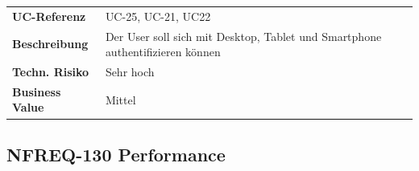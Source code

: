 \begin{longtable}[c]{@{}ll@{}}
\toprule
\begin{minipage}[t]{0.20\columnwidth}\raggedright\strut
\textbf{UC-Referenz}
\strut\end{minipage} &
\begin{minipage}[t]{0.74\columnwidth}\raggedright\strut
UC-25, UC-21, UC22
\strut\end{minipage}\tabularnewline
\begin{minipage}[t]{0.20\columnwidth}\raggedright\strut
\textbf{Beschreibung}
\strut\end{minipage} &
\begin{minipage}[t]{0.74\columnwidth}\raggedright\strut
Der User soll sich mit Desktop, Tablet und Smartphone authentifizieren
können
\strut\end{minipage}\tabularnewline
\begin{minipage}[t]{0.20\columnwidth}\raggedright\strut
\textbf{Techn. Risiko}
\strut\end{minipage} &
\begin{minipage}[t]{0.74\columnwidth}\raggedright\strut
Sehr hoch
\strut\end{minipage}\tabularnewline
\begin{minipage}[t]{0.20\columnwidth}\raggedright\strut
\textbf{Business Value}
\strut\end{minipage} &
\begin{minipage}[t]{0.74\columnwidth}\raggedright\strut
Mittel
\strut\end{minipage}\tabularnewline
\bottomrule
\end{longtable}

\subsection{NFREQ-130 Performance}\label{nfreq-130-performance}

